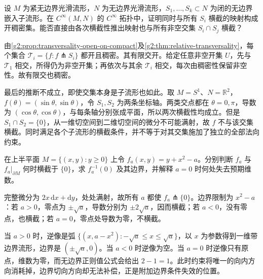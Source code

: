 \begin{exercise}\label{g2:ex:finite-simultaneous-transversality}
	设 \(M\) 为紧无边界光滑流形，\(N\) 为无边界光滑流形，\(S_1,\ldots,S_k\subset N\) 为闭的无边界嵌入子流形。在 \(C^\infty(M,N)\) 的 \(C^\infty\) 拓扑中，证明同时与所有 \(S_i\) 横截的映射构成开稠密集。能否直接由各次横截性推出映射也与所有非空交集 \(S_i\cap S_j\) 横截？
\end{exercise}
\begin{solution}
	由\cref{g2:prop:transversality-open-on-compact}及\cref{g2:thm:relative-transversality}，每个集合 \(\mathcal T_i=\{f:f\pitchfork S_i\}\) 都开且稠密。其有限交开。给定任意非空开集 \(U\)，先与 \(\mathcal T_1\) 相交，所得仍为非空开集；再依次与其余 \(\mathcal T_i\) 相交，每次由稠密性保留非空性。故有限交也稠密。

	最后的推断不成立，即使交集本身是子流形也如此。取 \(M=S^1\)、\(N=\mathbb R^2\)，\(f(\theta)=(\sin\theta,\sin\theta)\)，令 \(S_1,S_2\) 为两条坐标轴。两类交点都在 \(\theta=0,\pi\)，导数为 \((\cos\theta,\cos\theta)\)，与每条轴分别张成平面，所以两次横截性均成立。但是 \(S_1\cap S_2=\{0\}\)，从一维切空间到二维切空间的微分不可能满射，故 \(f\) 不与该交集横截。同时满足各个子流形的横截条件，并不等于对其交集施加了独立的全部法向约束。
\end{solution}

\begin{exercise}\label{g2:ex:boundary-parabola-levels}
	在上半平面 \(M=\{(x,y):y\ge0\}\) 上令 \(f_a(x,y)=y+x^2-a\)。分别判断 \(f_a\) 与 \(f_a|_{\partial M}\) 何时横截于 \(\{0\}\)，求 \(f_a^{-1}(0)\) 及其边界，并解释 \(a=0\) 时何处失去预期维数。
\end{exercise}
\begin{solution}
	完整微分为 \(2x\,\mathrm{d}x+\mathrm{d}y\)，处处满射，故所有 \(a\) 都使 \(f_a\pitchfork\{0\}\)。边界限制为 \(x^2-a\)：若 \(a>0\)，零点为 \(\pm\sqrt a\)，导数分别为 \(\pm2\sqrt a\)，因而横截；若 \(a<0\)，没有零点，也横截；若 \(a=0\)，零点处导数为零，不横截。

	当 \(a>0\) 时，逆像是弧 \(\{(x,a-x^2):-\sqrt a\le x\le\sqrt a\}\)，以 \(x\) 为参数得到一维带边界流形，边界是 \((\pm\sqrt a,0)\)。当 \(a<0\) 时逆像为空。当 \(a=0\) 时逆像只有原点，维数为零，而无边界正则值公式会给出 \(2-1=1\)。此时约束将唯一的向内方向消耗掉，边界切向方向却无法补偿，正是附加边界条件失效的位置。
\end{solution}

